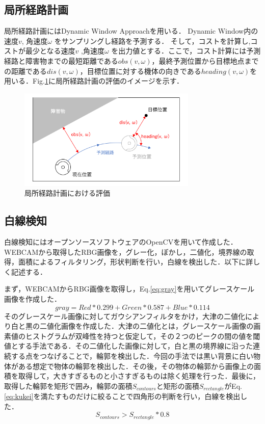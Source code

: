 \documentclass{jarticle}
\begin{document}
\subsection{局所経路計画}                                                  
局所経路計画にはDynamic Window Approachを用いる．
Dynamic Window内の速度$v$, 角速度$\omega$ をサンプリングし経路を予測する．
そして，コストを計算し,コストが最少となる速度$v$ ,角速度$\omega$ を出力値とする．ここで，コスト計算には予測経路と障害物までの最短距離である$obs(v,\omega)$，最終予測位置から目標地点までの距離である$dis(v,\omega)$，目標位置に対する機体の向きである$heading(v,\omega)$を用いる．Fig.\ref{fig:DWA}に局所経路計画の評価のイメージを示す．

\begin{figure}
	\includegraphics[width=8.5cm]{./picture/DWA.png}
	\caption{局所経路計画における評価}
	\label{fig:DWA}
\end{figure}

\subsection{白線検知}
白線検知にはオープンソースソフトウェアのOpenCV\cite{opencv}を用いて作成した．WEBCAMから取得したRBG画像を，グレー化，ぼかし，二値化，境界線の取得，面積によるフィルタリング，形状判断を行い，白線を検出した．以下に詳しく記述する．

まず，WEBCAMからRBG画像を取得し，Eq.\ref{eq:gray}を用いてグレースケール画像を作成した．
\begin{equation}
	gray = Red * 0.299 +  Green * 0.587 + Blue * 0.114
	\label{eq:gray}
\end{equation}
そのグレースケール画像に対してガウシアンフィルタをかけ，大津の二値化により白と黒の二値化画像を作成した．大津の二値化とは，グレースケール画像の画素値のヒストグラムが双峰性を持つと仮定して，その２つのピークの間の値を閾値とする手法である．その二値化した画像に対して，白と黒の境界線に沿った連続する点をつなげることで，輪郭を検出した．今回の手法では黒い背景に白い物体がある想定で物体の輪郭を検出した．その後，その物体の輪郭から画像上の面積を取得して，大きすぎるものと小さすぎるものは除く処理を行った．最後に，取得した輪郭を矩形で囲み，輪郭の面積$S_{contours}$と矩形の面積$S_{rectangle}$がEq.\ref{eq:kukei}を満たすものだけに絞ることで四角形の判断を行い，白線を検出した．
\begin{equation}
	S_{contours} > S_{rectangle} * 0.8
	\label{eq:kukei}
\end{equation}
\end{document}
